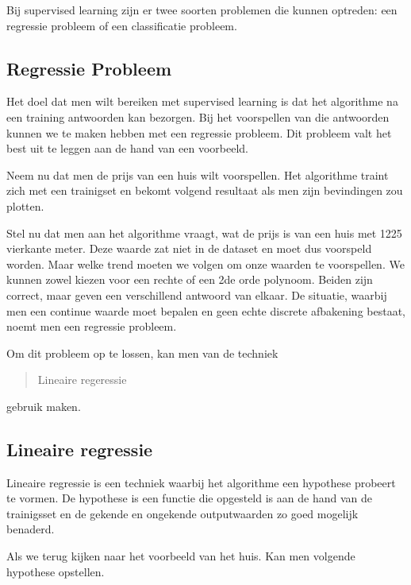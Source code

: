 Bij supervised learning zijn er twee soorten problemen die kunnen optreden: een regressie probleem of een classificatie probleem.

\subsection{Regressie Probleem}\label{Regressie Probleem}

Het doel dat men wilt bereiken met supervised learning is dat het algorithme na een training antwoorden kan bezorgen. Bij het voorspellen van die antwoorden kunnen we te maken hebben met een regressie probleem. Dit probleem valt het best uit te leggen aan de hand van een voorbeeld.

Neem nu dat men de prijs van een huis wilt voorspellen.
Het algorithme traint zich met een trainigset en bekomt volgend resultaat als men zijn bevindingen zou plotten.


Stel nu dat men aan het algorithme vraagt, wat de prijs is van een huis met 1225 vierkante meter. Deze waarde zat niet in de dataset en moet dus voorspeld worden.  Maar welke trend moeten we volgen om onze waarden te voorspellen. We kunnen zowel kiezen voor een rechte of een 2de orde polynoom. Beiden zijn correct, maar geven een verschillend antwoord van elkaar. De situatie, waarbij men een continue waarde moet bepalen en geen echte discrete afbakening bestaat, noemt men een regressie probleem.

Om dit probleem op te lossen, kan men van de techniek \begin{quote}Lineaire regeressie\end{quote} gebruik maken.

\subsection{Lineaire regressie}\label{Lineaire regressie}

Lineaire regressie is een techniek waarbij het algorithme een hypothese probeert te vormen. De hypothese is een functie die opgesteld is aan de hand van de trainigsset en de gekende en ongekende outputwaarden zo goed mogelijk benaderd.

Als we terug kijken naar het voorbeeld van het huis. Kan men volgende hypothese opstellen.


